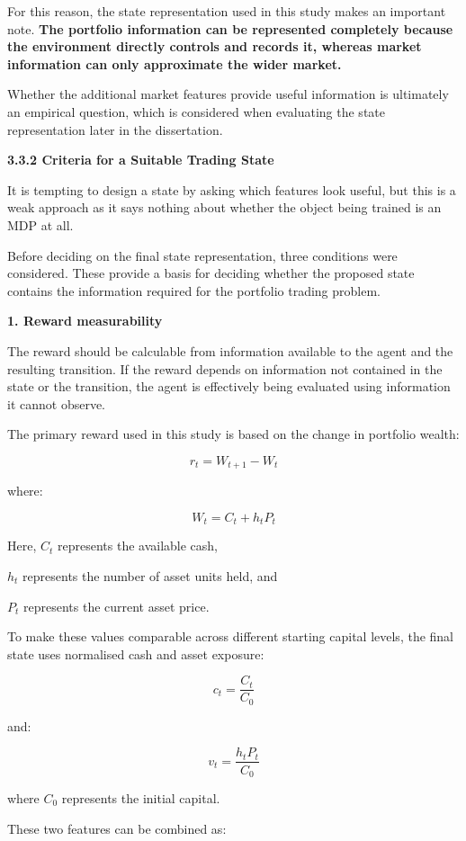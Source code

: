 For this reason, the state representation used in this study makes an
important note. \textbf{The portfolio information can be represented
completely because the environment directly controls and records it,
whereas market information can only approximate the wider market.}

Whether the additional market features provide useful information is
ultimately an empirical question, which is considered when evaluating
the state representation later in the dissertation.

\textbf{3.3.2 Criteria for a Suitable Trading State}

It is tempting to design a state by asking which features look useful,
but this is a weak approach as it says nothing about whether the object
being trained is an MDP at all.

Before deciding on the final state representation, three conditions were
considered. These provide a basis for deciding whether the proposed
state contains the information required for the portfolio trading
problem.

\textbf{1. Reward measurability}

The reward should be calculable from information available to the agent
and the resulting transition. If the reward depends on information not
contained in the state or the transition, the agent is effectively being
evaluated using information it cannot observe.

The primary reward used in this study is based on the change in
portfolio wealth:

\[r_{t} = W_{t + 1} - W_{t}\]

where:

\[W_{t} = C_{t} + h_{t}P_{t}\]

Here, \(C_{t}\) represents the available cash,

\(h_{t}\) represents the number of asset units held, and

\(P_{t}\) represents the current asset price.

To make these values comparable across different starting capital
levels, the final state uses normalised cash and asset exposure:

\[c_{t} = \frac{C_{t}}{C_{0}}\]

and:

\[v_{t} = \frac{h_{t}P_{t}}{C_{0}}\]

where \(C_{0}\) represents the initial capital.

These two features can be combined as:

